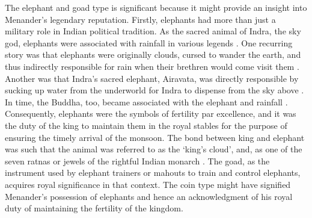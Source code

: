 \documentclass{ijsra}
\begin{document}
The elephant and goad type is significant because it might provide an insight into Menander’s legendary reputation.
Firstly, elephants had more than just a military role in Indian political tradition.
As the sacred animal of Indra, the sky god, elephants were associated with rainfall in various legends \parencites[19]{Gupta 1983}[37--43]{Srivastava1989}.
One recurring story was that elephants were originally clouds, cursed to wander the earth, 
and thus indirectly responsible for rain when their brethren would come visit them \parencite[38--39]{Gonda1966}. 
Another was that Indra’s sacred elephant, Airavata, was directly responsible by sucking up water from the underworld for
Indra to dispense from the sky above \parencite[23--24]{Gupta1983}. 
In time, the Buddha, too, became associated with the elephant and rainfall \parencite[23--24]{Gupta1983}. 
Consequently, elephants were the symbols of fertility par excellence, and it was the duty of the king to maintain them in
the royal stables for the purpose of ensuring the timely arrival of the monsoon. 
The bond between king and elephant was such that the animal was referred to as the ‘king’s cloud’, and,
as one of the seven ratnas or jewels of the rightful Indian monarch \parencites[38--39]{Gonda1966}[107]{Zimmer2015}.
The goad, as the instrument used by elephant trainers or mahouts to train and control elephants,
acquires royal significance in that context.
The coin type might have signified Menander’s possession of elephants and hence an acknowledgment of his royal duty of maintaining
the fertility of the kingdom.
\end{document}
